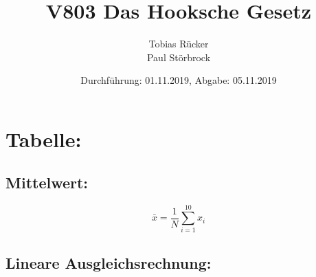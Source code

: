  


\title{V803 Das Hooksche Gesetz}
\author{  
 Tobias Rücker\\
 Paul Störbrock\\
 }
\date{Durchführung: 01.11.2019, Abgabe: 05.11.2019}


\maketitle


\newpage
\section{Tabelle:}   
\begin{table}
    \centering
    \label{tab:data}
       
\end{table}
    \subsection{Mittelwert:}
    \begin{equation}
        \bar{x} = \frac{1}{N}\sum\limits_{i=1}^{10} x_i
    \end{equation}

    \subsection{Lineare Ausgleichsrechnung:}

